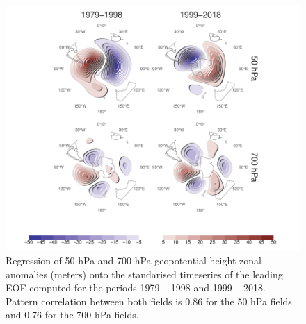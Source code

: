 \documentclass[smallextended]{svjour3}       %
\begin{document}
\begin{figure}
\includegraphics{A6-1} \caption{Regression of 50 hPa and 700 hPa geopotential height zonal anomalies (meters) onto the standarised timeseries of the leading EOF computed for the periods 1979 -- 1998 and 1999 -- 2018. Pattern correlation between both fields is 0.86 for the 50 hPa fields and 0.76 for the 700 hPa fields.}\label{fig:A6}
\end{figure}



\end{document}

